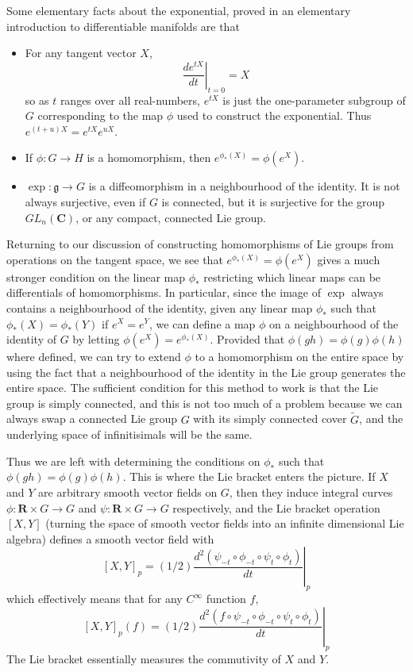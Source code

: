 Some elementary facts about the exponential, proved in an elementary introduction to differentiable manifolds are that
%
\begin{itemize}
    \item For any tangent vector $X$,
    \[ \left. \frac{de^{tX}}{dt} \right|_{t = 0} = X \]
    so as $t$ ranges over all real-numbers, $e^{tX}$ is just the one-parameter subgroup of $G$ corresponding to the map $\phi$ used to construct the exponential. Thus $e^{(t + u)X} = e^{tX} e^{uX}$.

    \item If $\phi: G \to H$ is a homomorphism, then $e^{\phi_*(X)} = \phi(e^X)$.

    \item $\exp: \mathfrak{g} \to G$ is a diffeomorphism in a neighbourhood of the identity. It is not always surjective, even if $G$ is connected, but it is surjective for the group $GL_n(\mathbf{C})$, or any compact, connected Lie group.
\end{itemize}
%
Returning to our discussion of constructing homomorphisms of Lie groups from operations on the tangent space, we see that $e^{\phi_*(X)} = \phi(e^X)$ gives a much stronger condition on the linear map $\phi_*$ restricting which linear maps can be differentials of homomorphisms. In particular, since the image of $\exp$ always contains a neighbourhood of the identity, given any linear map $\phi_*$ such that $\phi_*(X) = \phi_*(Y)$ if $e^X = e^Y$, we can define a map $\phi$ on a neighbourhood of the identity of $G$ by letting $\phi(e^X) = e^{\phi_*(X)}$. Provided that $\phi(gh) = \phi(g)\phi(h)$ where defined, we can try to extend $\phi$ to a homomorphism on the entire space by using the fact that a neighbourhood of the identity in the Lie group generates the entire space. The sufficient condition for this method to work is that the Lie group is simply connected, and this is not too much of a problem because we can always swap a connected Lie group $G$ with its simply connected cover $\tilde{G}$, and the underlying space of infinitisimals will be the same.

Thus we are left with determining the conditions on $\phi_*$ such that $\phi(gh) = \phi(g) \phi(h)$. This is where the Lie bracket enters the picture. If $X$ and $Y$ are arbitrary smooth vector fields on $G$, then they induce integral curves $\phi: \mathbf{R} \times G \to G$ and $\psi: \mathbf{R} \times G \to G$ respectively, and the Lie bracket operation $[X,Y]$ (turning the space of smooth vector fields into an infinite dimensional Lie algebra) defines a smooth vector field with
%
\[ [X,Y]_p = (1/2) \left. \frac{d^2 (\psi_{-t} \circ \phi_{-t} \circ \psi_t \circ \phi_t)}{dt} \right|_p \]
%
which effectively means that for any $C^\infty$ function $f$,
%
\[ [X,Y]_p(f) = (1/2) \left. \frac{d^2 (f \circ \psi_{-t} \circ \phi_{-t} \circ \psi_t \circ \phi_t)}{dt} \right|_p \]
%
The Lie bracket essentially measures the commutivity of $X$ and $Y$.

